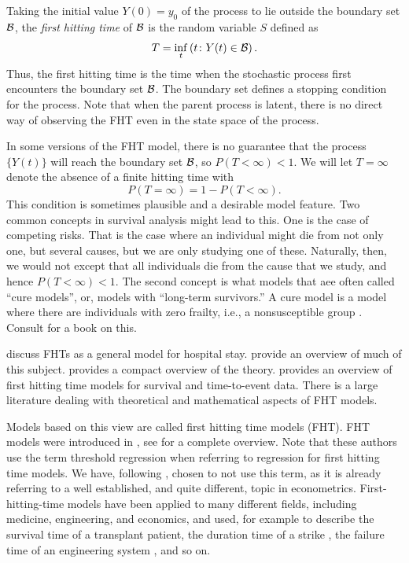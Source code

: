 Taking the initial value $Y(0)=y_0$ of the process to lie outside the boundary set $\mathcal{B}$, the \textit{first hitting time} of $\mathcal{B}$ is the random variable $S$ defined as
\begin{equation}\label{eq:fht-t}
    T=\inf_t\left(t\colon Y(t)\in\mathcal{B}\right).
\end{equation}
Thus, the first hitting time is the time when the stochastic process first encounters the boundary set $\mathcal{B}$. The boundary set defines a stopping condition for the process. Note that when the parent process is latent, there is no direct way of observing the FHT even in the state space of the process.

In some versions of the FHT model, there is no guarantee that the process $\{Y(t)\}$ will reach the boundary set $\mathcal{B}$, so $P(T<\infty)<1$. We will let $T=\infty$ denote the absence of a finite hitting time with
\begin{equation}
    P(T=\infty)=1-P(T<\infty).
\end{equation}
This condition is sometimes plausible and a desirable model feature.
Two common concepts in survival analysis might lead to this.
One is the case of competing risks.
That is the case where an individual might die from not only one, but several causes, but we are only studying one of these.
Naturally, then, we would not except that all individuals die from the cause that we study, and hence $P(T<\infty)<1$.
The second concept is what models that aee often called ``cure models'', or, models with ``long-term survivors.''
A cure model is a model where there are individuals with zero frailty, i.e., a nonsusceptible group \citep{ABG}.
Consult \citet{maller1996survival} for a book on this.

\citet{eaton-whitmore} discuss FHTs as a general model for hospital stay. \citet{aalengjessing2001} provide an overview of much of this subject. \citet{lawless2011} provides a compact overview of the theory. \citet{leewhitmore2004a} provides an overview of first hitting time models for survival and time-to-event data. There is a large literature dealing with theoretical and mathematical aspects of FHT models.

Models based on this view are called first hitting time models (FHT). FHT models were introduced in \citet{whitmore1986}, see \citet{leewhitmore2006} for a complete overview. Note that these authors use the term threshold regression when referring to regression for first hitting time models. We have, following \citet{caroni2017}, chosen to not use this term, as it is already referring to a well established, and quite different, topic in econometrics. First-hitting-time models have been applied to many different fields, including medicine, engineering, and economics, and used, for example to describe the survival time of a transplant patient, the duration time of a strike \citep{lancaster}, the failure time of an engineering system , and so on.

